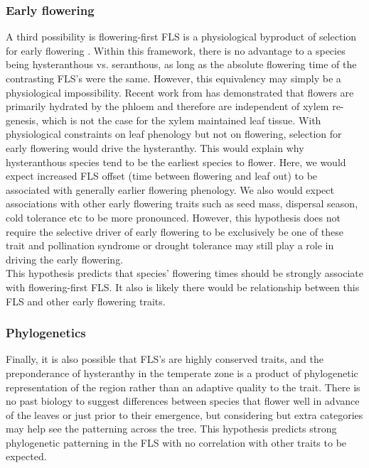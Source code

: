 \documentclass[12pt]{article}\usepackage[]{graphicx}\usepackage[]{color}
\begin{document}
\subsubsection*{Early flowering}
\indent\indent A third possibility is flowering-first FLS is a physiological byproduct of selection for early flowering \citep{Primack1987}.%
Within this framework, there is no advantage to a species being hysteranthous vs. seranthous, as long as the absolute flowering time of the contrasting FLS's were the same. However, this equivalency may simply be a physiological impossibility. Recent work from \citet{Savage2019} has demonstrated that flowers are primarily hydrated by the phloem and therefore are independent of xylem re-genesis, which is not the case for the xylem maintained leaf tissue. With physiological constraints on leaf phenology but not on flowering, selection for early flowering would drive the hysteranthy. This would explain why hysteranthous species tend to be the earliest species to flower. Here, we would expect increased FLS offset (time between flowering and leaf out) to be associated with generally earlier flowering phenology. We also would expect associations with other early flowering traits such as seed mass, dispersal season, cold tolerance etc to be more pronounced. However, this hypothesis does not require the selective driver of early flowering to be exclusively be one of these trait and pollination syndrome or drought tolerance may still play a role in driving the early flowering.\\
\indent This hypothesis predicts that species' flowering times should be strongly associate with flowering-first FLS. It also is likely there would be relationship between this FLS and other early flowering traits.
\subsubsection*{Phylogenetics} 
\indent\indent Finally, it is also possible that FLS's are highly conserved traits, and the preponderance of hysteranthy in the temperate zone is a product of phylogenetic representation of the region rather than an adaptive quality to the trait. There is no past biology to suggest differences between species that flower well in advance of the leaves or just prior to their emergence, but considering but extra categories may help see the patterning across the tree. This hypothesis predicts strong phylogenetic patterning in the FLS with no correlation with other traits to be expected.\\
\end{document}
